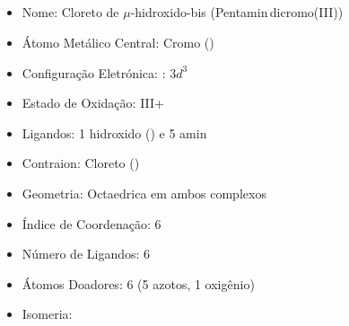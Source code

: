 \documentclass[12pt]{article}
\begin{document}
\noindent\begin{minipage}{\textwidth}
	
	\subsection{}
	\begin{itemize}
   \item Nome:
   	Cloreto de $\mu$-hidroxido-bis (Pentamin\,dicromo(III))
   
   \item Átomo Metálico Central:
   	Cromo ()
   	
   \item Configuração Eletrónica:
   	\ch{[Ar]}: $3d^3$
   
   \item Estado de Oxidação:
   	III+
   
   \item Ligandos:
   	1 hidroxido () e 5 amin
   
   \item Contraion:
   	Cloreto ()
   
   \item Geometria:
   	Octaedrica em ambos complexos
   
   
   \item Índice de Coordenação: 
   	6
   	
   \item Número de Ligandos:
   	6
   
   \item Átomos Doadores:
   	6 (5 azotos, 1 oxigênio)
   
   \item Isomeria:
   	
   
	\end{itemize}
	
\end{minipage}
\end{document}
